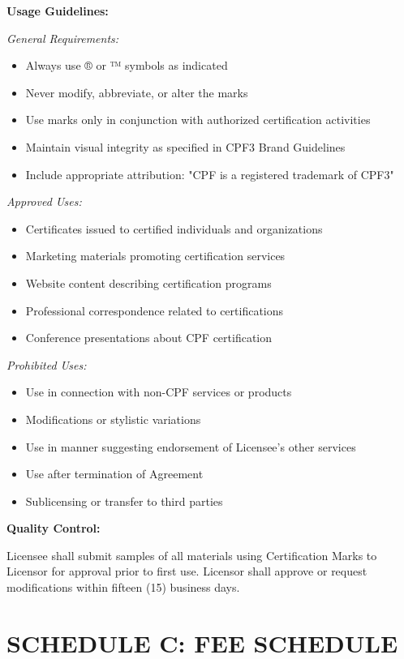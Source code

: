 \documentclass[11pt,a4paper]{article}
\begin{document}
\textbf{Usage Guidelines:}

\textit{General Requirements:}
\begin{itemize}
\item Always use ® or ™ symbols as indicated
\item Never modify, abbreviate, or alter the marks
\item Use marks only in conjunction with authorized certification activities
\item Maintain visual integrity as specified in CPF3 Brand Guidelines
\item Include appropriate attribution: "CPF is a registered trademark of CPF3"
\end{itemize}

\textit{Approved Uses:}
\begin{itemize}
\item Certificates issued to certified individuals and organizations
\item Marketing materials promoting certification services
\item Website content describing certification programs
\item Professional correspondence related to certifications
\item Conference presentations about CPF certification
\end{itemize}

\textit{Prohibited Uses:}
\begin{itemize}
\item Use in connection with non-CPF services or products
\item Modifications or stylistic variations
\item Use in manner suggesting endorsement of Licensee's other services
\item Use after termination of Agreement
\item Sublicensing or transfer to third parties
\end{itemize}

\textbf{Quality Control:}

Licensee shall submit samples of all materials using Certification Marks to Licensor for approval prior to first use. Licensor shall approve or request modifications within fifteen (15) business days.

\newpage

\section*{SCHEDULE C: FEE SCHEDULE}
\end{document}
